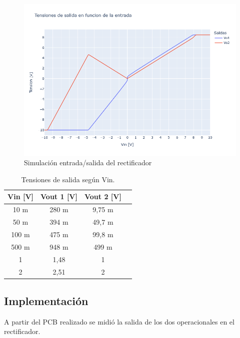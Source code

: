 \begin{figure}[H]
    \centering
    \includegraphics[width=0.9\linewidth]{Secciones/Circuito3/TP1_3_Vo1_Vo2_vs_Vin.png}
    \caption{Simulación entrada/salida del rectificador}
    \label{fig:TP1_3_Vo1_Vo2_vs_Vin}
\end{figure}

\begin{table}[H]
\centering
\begin{tabular}{|c|c|c|c|}
\hline
\textbf{Vin [V]} & \textbf{Vout 1 [V]} & \textbf{Vout 2 [V]} \\ \hline
 10 m &  280 m &   9,75 m \\ \hline
 50 m &  394 m &  49,7  m \\ \hline
100 m &  475 m &  99,8  m \\ \hline
500 m &  948 m & 499    m \\ \hline
    1 & 1,48   &   1      \\ \hline
    2 & 2,51   &   2      \\ \hline
\end{tabular}
\caption{Tensiones de salida según Vin.}
\label{tab:TP1_3_Vo1_Vo2_vs_Vin}
\end{table}

\subsection{Implementación}
A partir del PCB realizado se midió la salida de los dos operacionales en el rectificador.

